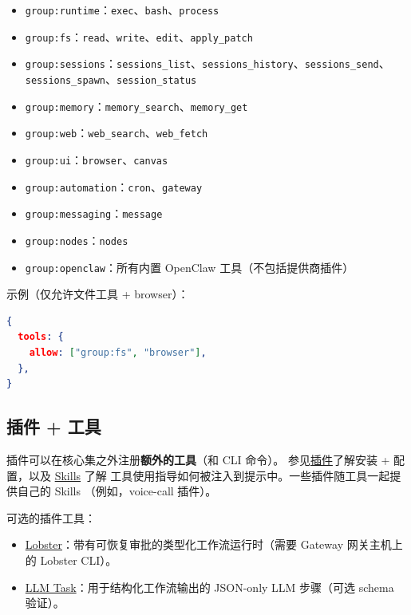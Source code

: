 \begin{itemize}
  \item \texttt{group:runtime}：\texttt{exec}、\texttt{bash}、\texttt{process}
  \item \texttt{group:fs}：\texttt{read}、\texttt{write}、\texttt{edit}、\texttt{apply\_patch}
  \item \texttt{group:sessions}：\texttt{sessions\_list}、\texttt{sessions\_history}、\texttt{sessions\_send}、\texttt{sessions\_spawn}、\texttt{session\_status}
  \item \texttt{group:memory}：\texttt{memory\_search}、\texttt{memory\_get}
  \item \texttt{group:web}：\texttt{web\_search}、\texttt{web\_fetch}
  \item \texttt{group:ui}：\texttt{browser}、\texttt{canvas}
  \item \texttt{group:automation}：\texttt{cron}、\texttt{gateway}
  \item \texttt{group:messaging}：\texttt{message}
  \item \texttt{group:nodes}：\texttt{nodes}
  \item \texttt{group:openclaw}：所有内置 OpenClaw 工具（不包括提供商插件）
\end{itemize}


示例（仅允许文件工具 + browser）：

\begin{lstlisting}[language=json]
{
  tools: {
    allow: ["group:fs", "browser"],
  },
}
\end{lstlisting}


\subsection{插件 + 工具}


插件可以在核心集之外注册\textbf{额外的工具}（和 CLI 命令）。
参见\href{/tools/plugin}{插件}了解安装 + 配置，以及 \href{/tools/skills}{Skills} 了解
工具使用指导如何被注入到提示中。一些插件随工具一起提供自己的 Skills
（例如，voice-call 插件）。

可选的插件工具：

\begin{itemize}
  \item \href{/tools/lobster}{Lobster}：带有可恢复审批的类型化工作流运行时（需要 Gateway 网关主机上的 Lobster CLI）。
  \item \href{/tools/llm-task}{LLM Task}：用于结构化工作流输出的 JSON-only LLM 步骤（可选 schema 验证）。
\end{itemize}



